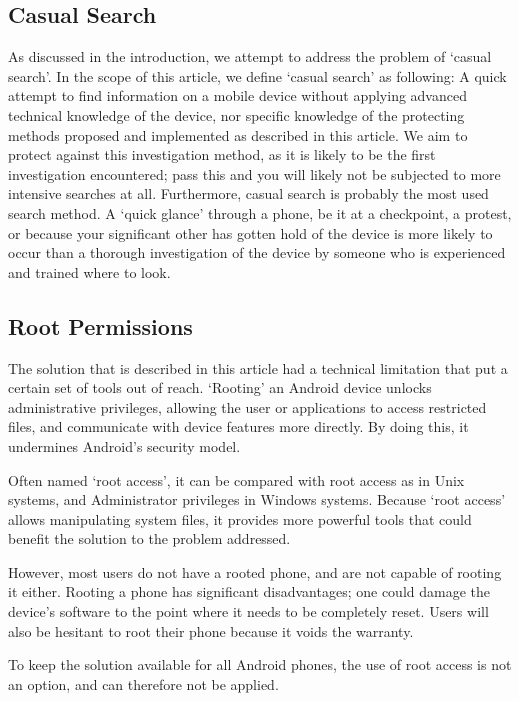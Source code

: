 \subsection{Casual Search}
As discussed in the introduction, we attempt to address the problem of `casual search'. 
In the scope of this article, we define `casual search' as following: A quick attempt to find information on a mobile device without applying advanced technical knowledge of the device, nor specific knowledge of the protecting methods proposed and implemented as described in this article.
We aim to protect against this investigation method, as it is likely to be the first investigation encountered; pass this and you will likely not be subjected to more intensive searches at all.
Furthermore, casual search is probably the most used search method. 
A `quick glance' through a phone, be it at a checkpoint, a protest, or because your significant other has gotten hold of the device is more likely to occur than a thorough investigation of the device by someone who is experienced and trained where to look.

\subsection{Root Permissions}
The solution that is described in this article had a technical limitation that put a certain set of tools out of reach.
`Rooting' an Android device unlocks administrative privileges, allowing the user or applications to access restricted files, and communicate with device features more directly.
By doing this, it undermines Android's security model\cite{vidas2011all}.

Often named `root access', it can be compared with root access as in Unix systems, and Administrator privileges in Windows systems.
Because `root access' allows manipulating system files, it provides more powerful tools that could benefit the solution to the problem addressed.

However, most users do not have a rooted phone, and are not capable of rooting it either. 
Rooting a phone has significant disadvantages; one could damage the device's software to the point where it needs to be completely reset.
Users will also be hesitant to root their phone because it voids the warranty.

To keep the solution available for all Android phones, the use of root access is not an option, and can therefore not be applied.

